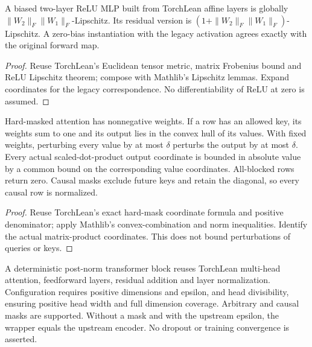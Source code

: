 \begin{lemma}\label{lem:reuse_mlp}
\leanok
A biased two-layer ReLU MLP built from TorchLean affine layers is globally
$\|W_2\|_F\|W_1\|_F$-Lipschitz. Its residual version is
$(1+\|W_2\|_F\|W_1\|_F)$-Lipschitz. A zero-bias instantiation with the legacy
activation agrees exactly with the original forward map.
\end{lemma}
\begin{proof}
\leanok
Reuse TorchLean's Euclidean tensor metric, matrix Frobenius bound and ReLU
Lipschitz theorem; compose with Mathlib's Lipschitz lemmas. Expand coordinates
for the legacy correspondence. No differentiability of ReLU at zero is assumed.
\end{proof}

\begin{lemma}\label{lem:reuse_attention}
\leanok
Hard-masked attention has nonnegative weights. If a row has an allowed key,
its weights sum to one and its output lies in the convex hull of its values.
With fixed weights, perturbing every value by at most $\delta$ perturbs the
output by at most $\delta$. Every actual scaled-dot-product output coordinate
is bounded in absolute value by a common bound on the corresponding value
coordinates. All-blocked rows return zero. Causal masks exclude future keys
and retain the diagonal, so every causal row is normalized.
\end{lemma}
\begin{proof}
\leanok
Reuse TorchLean's exact hard-mask coordinate formula and positive denominator;
apply Mathlib's convex-combination and norm inequalities. Identify the actual
matrix-product coordinates. This does not bound perturbations of queries or keys.
\end{proof}

\begin{definition}\label{def:reuse_transformer}
\leanok
A deterministic post-norm transformer block reuses TorchLean multi-head
attention, feedforward layers, residual addition and layer normalization.
Configuration requires positive dimensions and epsilon, and head divisibility,
ensuring positive head width and full dimension coverage. Arbitrary and causal
masks are supported. Without a mask and with the upstream epsilon, the wrapper
equals the upstream encoder. No dropout or training convergence is asserted.
\end{definition}

